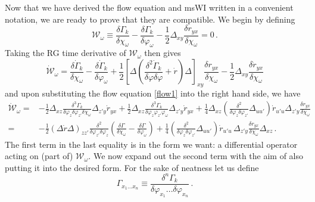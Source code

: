 \documentclass[11pt]{book} %
\begin{document}
Now that we have derived the flow equation and msWI written in a convenient notation, we are ready to prove that they are compatible. We begin by defining
\begin{equation}
\label{cal-W}
	\mathcal{W}_\omega\equiv\frac{\delta \Gamma_k}{\delta\chi_\omega}-\frac{\delta \Gamma_k}{\delta\varphi_\omega}
	-\frac{1}{2}\Delta_{xy}\frac{\delta r_{yx}}{\delta\chi_\omega} =0 \,.
\end{equation}
Taking the RG time derivative of $\mathcal{W_\omega}$ then gives
\begin{equation}
	\label{WIdot}
	\mathcal{\dot W}_\omega= \frac{\delta \dot\Gamma_k}{\delta\chi_\omega}
	-\frac{\delta \dot\Gamma_k}{\delta\varphi_\omega}+
	\frac{1}{2}\left[\Delta\left(\frac{\delta^{2}\dot{\Gamma}_k}{\delta\varphi \delta\varphi}
	+\dot r\right)\Delta\right]_{\!xy}\frac{\delta r_{yx}}{\delta\chi_\omega}
	-\frac{1}{2}\Delta_{xy}\frac{\delta \dot r_{yx}}{\delta\chi_\omega}
\end{equation}
and upon substituting the flow equation \eqref{flow1} into the right hand side, we have
\begin{align}\label{WIdot-2}
	\mathcal{\dot W}_{\omega}=&-\frac{1}{2}\Delta_{xz}
	\frac{\delta^{3}\Gamma_k}{\delta\varphi_{z}\delta\varphi_{z'}\delta\chi_{\omega}}\Delta_{z'y}\dot r_{yx}
	 + \frac{1}{2}\Delta_{xz}\frac{\delta^{3}\Gamma_k}{\delta\varphi_{z}
	 \varphi_{z'}\varphi_\omega}\Delta_{z'y}\dot{r}_{yx}
	 +\frac{1}{4}\Delta_{xz}\left(\frac{\delta^{2}}{\delta\varphi_{z}\delta\varphi_{z'}}\Delta_{uu'}\right)
	 \dot r_{u'u}\Delta_{z'y}\frac{\delta r_{yx}}{\delta\chi_{\omega}}\nonumber\\
	=&-\frac{1}{2}(\Delta \dot{r} \Delta)_{zz'}\frac{\delta^{2}}{\delta\varphi_{z'}\delta\varphi_{z}}
	 \left(\frac{\delta\Gamma}{\delta\chi_\omega}-\frac{\delta\Gamma}{\delta\varphi_\omega}\right)
	  +\frac{1}{4}\left(\frac{\delta^{2}}{\delta\varphi_{z}\delta\varphi_{z'}}\Delta_{uu'}\right)
	 \dot r_{u'u}\,\Delta_{z'y}\frac{\delta r_{yx}}{\delta\chi_{\omega}}\Delta_{xz} \,.
\end{align}
The first term in the last equality is in the form we want: a differential operator acting on (part of) $\mathcal{W_\omega}$. We now expand out the second term with the aim of also putting it into the desired form. For the sake of neatness let us define
\begin{equation}
		\Gamma_{x_1...x_n}\equiv \frac{\delta^n\Gamma_k}{\delta\varphi_{x_1}...\delta\varphi_{x_n}} \,.
\end{equation}
\end{document}
